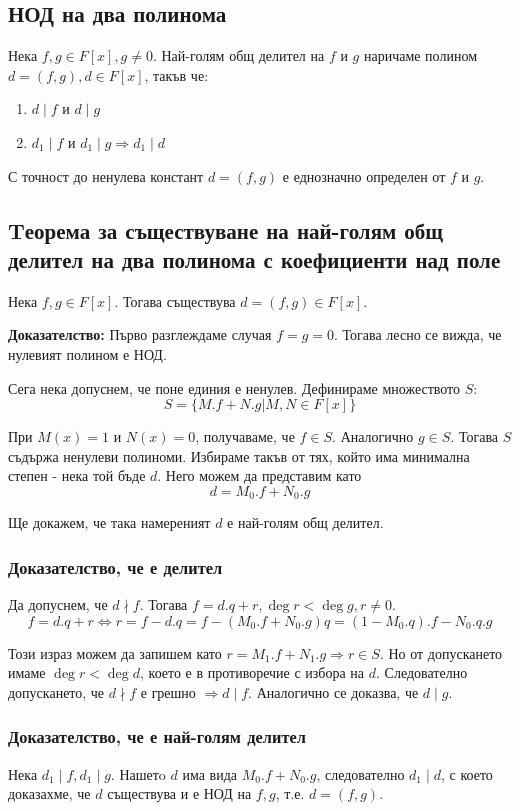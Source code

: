 \documentclass[fleqn,12pt]{article}
\begin{document}
\subsection{НОД на два полинома}
Нека $f,g \in F[x], g \neq 0$. Най-голям общ делител на $f$ и $g$ наричаме 
полином $d = (f,g), d \in F[x]$, такъв че:
\begin{enumerate}
    \item $d \mid f$ и $d \mid g$
    \item $d_1 \mid f$ и $d_1 \mid g \Rightarrow d_1 \mid d$
\end{enumerate}

С точност до ненулева констант $d=(f,g)$ е еднозначно определен от $f$ и $g$.

\subsection{Tеорема за съществуване на най-голям общ делител на два полинома с коефициенти над поле}
\label{sec:gcd_exist}
Нека $f,g \in F[x]$. Тогава съществува $d=(f,g) \in F[x]$.

\textbf{Доказателство: } Първо разглеждаме случая $f = g = 0$. Тогава лесно се вижда, че нулевият полином е НОД.

Сега нека допуснем, че поне единия е ненулев. Дефинираме множеството $S$:
\[ S = \{ M.f + N.g | M,N \in F[x] \} \]

При $M(x) = 1$ и $N(x) = 0$, получаваме, че $f \in S$. Аналогично $g \in S$. 
Тогава $S$ съдържа ненулеви полиноми. Избираме такъв от тях, който има минимална степен
 - нека той бъде $d$. Него можем да представим като
\[ d = M_0.f + N_0.g \]

Ще докажем, че така намереният $d$ е най-голям общ делител.

\subsubsection{Доказателство, че е делител}
Да допуснем, че $d \nmid f$. Тогава $f = d.q + r, \deg r < \deg g, r \neq 0$.
\[ f = d.q + r \Leftrightarrow r = f - d.q = 
f - (M_0 . f + N_0 . g)q = 
(1 - M_0 . q) . f - N_0 . q . g \]

Този израз можем да запишем като $r = M_1 . f + N_1 . g \Rightarrow r \in S$.
Но от допускането имаме $\deg r < \deg d$, което е в противоречие с избора на $d$.
Следователно допускането, че $d \nmid f$ е грешно $\Rightarrow d \mid f$.
Аналогично се доказва, че $d \mid g$.

\subsubsection{Доказателство, че е най-голям делител}
Нека $d_1 \mid f, d_1 \mid g$. Нашетo $d$ има вида $M_0.f + N_0.g$, следователно $d_1 \mid d$, с което
доказахме, че $d$ съществува и е НОД на $f,g$, т.е. $d = (f,g)$.
\end{document}

